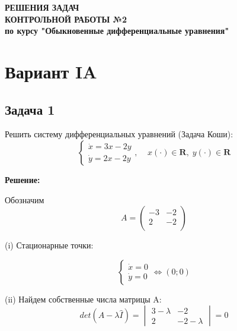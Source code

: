 \documentclass[a4paper, 12pt]{article}
\begin{document}
\begin{titlepage}
\begin{center}


\vfill






\textbf{РЕШЕНИЯ ЗАДАЧ \\[3mm]
КОНТРОЛЬНОЙ РАБОТЫ №2\\[3mm]
по курсу "Обыкновенные дифференциальные уравнения"
\\[20mm]
}
\end{center}


\tableofcontents

\end{titlepage}

\newpage




	\section{Вариант IA}
		\subsection {Задача 1}


 Решить систему дифференциальных уравнений (Задача Коши): 
\begin{equation}
\left\{
\begin{array}{lr}
\dot{x} = 3x-2y\\
\dot{y} = 2x-2y
\end{array}
\right.
, \;\;\;\; x(\cdot)\in \textbf{R},\; y(\cdot)\in \textbf{R}
\label{eq:1}
\end{equation}

\textbf{Решение:} \par
Обозначим 
\[
A = \left(
\begin{array}{cc}
-3 & -2\\
2 & -2\\
\end{array}
\right)\]

(i) Стационарные точки:

\[
\left\{
\begin{array}{lr}
\dot{x} = 0\\
\dot{y} = 0
\end{array}
\right.
\Leftrightarrow (0;0)
\]


(ii) Найдем собственные числа матрицы A:
\[det(A-\lambda \hat{I})=
\begin{vmatrix}
3-\lambda & -2 \\
2 & -2-\lambda
\end{vmatrix}
=0\]
\end{document}
